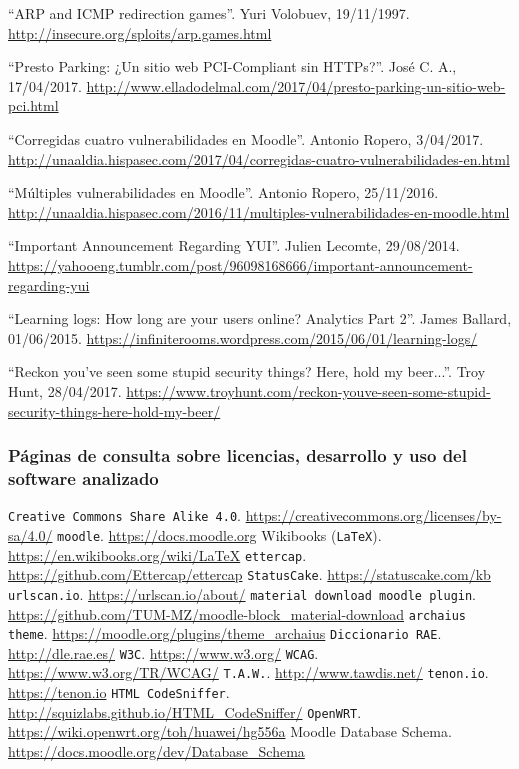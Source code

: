  ``ARP and ICMP redirection games''. Yuri Volobuev, 19/11/1997. \url{http://insecure.org/sploits/arp.games.html}

 ``Presto Parking: ¿Un sitio web PCI-Compliant sin HTTPs?''. José C. A., 17/04/2017. \url{http://www.elladodelmal.com/2017/04/presto-parking-un-sitio-web-pci.html}

 ``Corregidas cuatro vulnerabilidades en Moodle''. Antonio Ropero, 3/04/2017. \url{http://unaaldia.hispasec.com/2017/04/corregidas-cuatro-vulnerabilidades-en.html}

 ``Múltiples vulnerabilidades en Moodle''. Antonio Ropero, 25/11/2016. \url{http://unaaldia.hispasec.com/2016/11/multiples-vulnerabilidades-en-moodle.html}

 ``Important Announcement Regarding YUI''. Julien Lecomte, 29/08/2014. \url{https://yahooeng.tumblr.com/post/96098168666/important-announcement-regarding-yui}

 ``Learning logs: How long are your users online? Analytics Part 2''. James Ballard, 01/06/2015. \url{https://infiniterooms.wordpress.com/2015/06/01/learning-logs/}

 ``Reckon you've seen some stupid security things? Here, hold my beer...''. Troy Hunt, 28/04/2017. \url{https://www.troyhunt.com/reckon-youve-seen-some-stupid-security-things-here-hold-my-beer/}

\bigskip
\subsubsection*{Páginas de consulta sobre licencias, desarrollo y uso del software analizado}
 {\tt Creative Commons Share Alike 4.0}. \url{https://creativecommons.org/licenses/by-sa/4.0/}
 {\tt moodle}. \url{https://docs.moodle.org}
 Wikibooks ({\tt LaTeX}). \url{https://en.wikibooks.org/wiki/LaTeX}
 {\tt ettercap}. \url{https://github.com/Ettercap/ettercap}
 {\tt StatusCake}. \url{https://statuscake.com/kb}
 {\tt urlscan.io}. \url{https://urlscan.io/about/}
 {\tt material download moodle plugin}. \url{https://github.com/TUM-MZ/moodle-block_material-download}
 {\tt archaius theme}. \url{https://moodle.org/plugins/theme_archaius}
 {\tt Diccionario RAE}. \url{http://dle.rae.es/}
 {\tt W3C}. \url{https://www.w3.org/}
 {\tt WCAG}. \url{https://www.w3.org/TR/WCAG/}
 {\tt T.A.W.}. \url{http://www.tawdis.net/}
 {\tt tenon.io}. \url{https://tenon.io}
 {\tt HTML CodeSniffer}. \url{http://squizlabs.github.io/HTML_CodeSniffer/}
 {\tt OpenWRT}. \url{https://wiki.openwrt.org/toh/huawei/hg556a}
 Moodle Database Schema. \url{https://docs.moodle.org/dev/Database_Schema}



